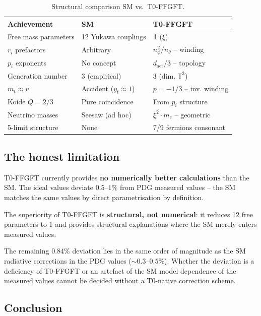 \begin{table}[htbp]
\centering\footnotesize
\begin{tabular}{lll}
\toprule
\textbf{Achievement} & \textbf{SM} & \textbf{T0-FFGFT} \\
\midrule
Free mass parameters  & 12 Yukawa couplings & \textbf{1} ($\xi$) \\
$r_i$ prefactors      & Arbitrary & $n_\phi^2/n_\theta$ -- winding \\
$p_i$ exponents       & No concept & $d_{\text{act}}/3$ -- topology \\
Generation number     & 3 (empirical) & 3 (dim. $\mathbb{T}^3$) \\
$m_t \approx v$       & Accident ($y_t \approx 1$) & $p=-1/3$ -- inv. winding \\
Koide $Q=2/3$         & Pure coincidence & From $p_i$ structure \\
Neutrino masses       & Seesaw (ad hoc) & $\xi^2 \cdot m_e$ -- geometric \\
5-limit structure     & None & 7/9 fermions consonant \\
\bottomrule
\end{tabular}
\caption{Structural comparison SM vs.\ T0-FFGFT.}
\label{tab:sm_comparison}
\end{table}

\subsection{The honest limitation}

\begin{warnbox}
T0-FFGFT currently provides \textbf{no numerically better calculations}
than the SM. The ideal values deviate $0.5$--$1\%$ from PDG measured
values -- the SM matches the same values by direct parametrisation
by definition.

The superiority of T0-FFGFT is \textbf{structural, not numerical}:
it reduces 12 free parameters to 1 and provides structural explanations
where the SM merely enters measured values.
\end{warnbox}

The remaining $0.84\%$ deviation lies in the same order of magnitude
as the SM radiative corrections in the PDG values ($\sim 0.3$--$0.5\%$).
Whether the deviation is a deficiency of T0-FFGFT or an artefact of
the SM model dependence of the measured values cannot be decided
without a T0-native correction scheme.

\subsection{Conclusion}

